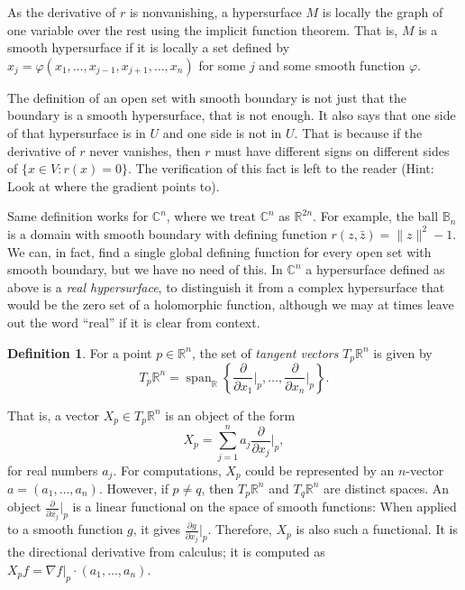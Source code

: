 \documentclass[12pt,openany]{book}
\newcommand{\snorm}[1]{\lVert {#1} \rVert}
\newcommand{\C}{{\mathbb{C}}}
\newcommand{\R}{{\mathbb{R}}}
\newcommand{\bB}{{\mathbb{B}}}
\newcommand{\myindex}[1]{#1\index{#1}}
\theoremstyle{plain}
\theoremstyle{remark}
\theoremstyle{definition}
\newtheorem{defn}[thm]{Definition}
\theoremstyle{exercise}
\theoremstyle{example}
\begin{document}
As the derivative of $r$ is nonvanishing, a
hypersurface $M$ is locally the graph of one variable over the rest
using the implicit function theorem.  That is, $M$ is a smooth 
hypersurface if it is locally a set defined by
$x_j = \varphi(x_1,\ldots,x_{j-1},x_{j+1},\ldots,x_n)$ for some $j$ and some
smooth function $\varphi$.

The definition of an open set with smooth boundary is not just that the
boundary is a smooth hypersurface, that is not enough.  It also says that 
one side of that hypersurface is in $U$ and one side is not in $U$.  That is
because if the derivative of $r$ never vanishes, then $r$ must have
different signs on different sides of $\bigl\{ x \in V : r(x) = 0 \bigr\}$.  The
verification of this fact is left to the reader (Hint: Look at where the
gradient points to).

Same definition works for $\C^n$, where we treat $\C^n$ as $\R^{2n}$.
For example, the ball $\bB_n$ is a domain with smooth boundary with defining
function $r(z,\bar{z}) = \snorm{z}^2-1$.  We can, in fact, find a
single global defining function for every open set with smooth boundary,
but we have no need of this.
In $\C^n$
a hypersurface defined as above is a \emph{\myindex{real hypersurface}},
to distinguish it from a complex hypersurface that would be the zero set of
a holomorphic function, although we may at times leave out the word ``real''
if it is clear from context.

\begin{defn}
For a point $p \in \R^n$, the set of \emph{tangent vectors} $T_p \R^n$ is given by
%
\begin{equation*}
T_p \R^n = \operatorname{span}_{\R} \left\{
\frac{\partial}{\partial x_1}\Big|_p,
\ldots,
\frac{\partial}{\partial x_n}\Big|_p \right\} .
\end{equation*}
\end{defn}

That is, a vector $X_p \in T_p \R^n$ is an object of the form
\begin{equation*}
X_p = \sum_{j=1}^n a_j 
\frac{\partial}{\partial x_j}\Big|_p ,
\end{equation*}
for real numbers $a_j$.  For computations, $X_p$ could be represented
by an $n$-vector $a = (a_1,\ldots,a_n)$.  However, if $p \not= q$, then
$T_p \R^n$ and
$T_q \R^n$ are distinct spaces.
%
An object
$\frac{\partial}{\partial x_j}\big|_p$
is a linear functional
on the space of smooth functions:
When applied to a smooth function $g$, it gives
$\frac{\partial g}{\partial x_j} \big|_p$.  Therefore, $X_p$ is also such a
functional.  It is the directional derivative from calculus;
it is computed as $X_p f = \nabla f|_p \cdot (a_1,\ldots,a_n)$.
\end{document}

